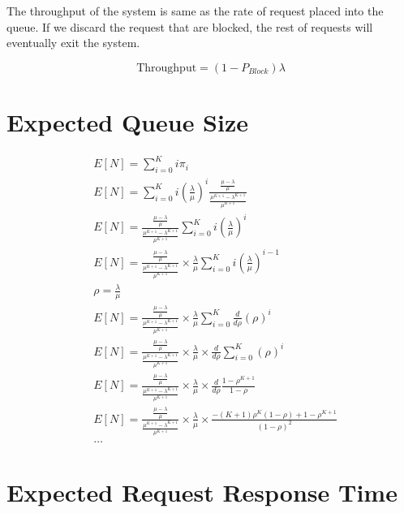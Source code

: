 \documentclass{article}
\begin{document}
The throughput of the system is same as the rate of request placed into the
queue. If we discard the request that are blocked, the rest of requests will
eventually exit the system.

\begin{equation}
	\text{Throughput} = (1 - P_{Block}) \lambda
\end{equation}


\section{Expected Queue Size}

\begin{align*}
	&E[N] = \sum_{i = 0}^{K}{i \pi_{i}} \\
	&E[N] = \sum_{i = 0}^{K}{i {(\frac{\lambda}{\mu})}^{i} \frac{\frac{\mu - \lambda}{\mu}}{\frac{\mu^{K+1} - \lambda^{K+1}}{{\mu^{K+1}}}}} \\
	&E[N] = \frac{\frac{\mu - \lambda}{\mu}}{\frac{\mu^{K+1} - \lambda^{K+1}}{{\mu^{K+1}}}} \sum_{i = 0}^{K}{i {(\frac{\lambda}{\mu})}^{i}} \\
	&E[N] = \frac{\frac{\mu - \lambda}{\mu}}{\frac{\mu^{K+1} - \lambda^{K+1}}{{\mu^{K+1}}}} \times \frac{\lambda}{\mu} \sum_{i = 0}^{K}{i {(\frac{\lambda}{\mu})}^{i - 1}} \\
	& \rho = \frac{\lambda}{\mu} \\
	&E[N] = \frac{\frac{\mu - \lambda}{\mu}}{\frac{\mu^{K+1} - \lambda^{K+1}}{{\mu^{K+1}}}} \times \frac{\lambda}{\mu} \sum_{i = 0}^{K}{\frac{d}{d \rho} {(\rho)}^{i}} \\
	&E[N] = \frac{\frac{\mu - \lambda}{\mu}}{\frac{\mu^{K+1} - \lambda^{K+1}}{{\mu^{K+1}}}} \times \frac{\lambda}{\mu} \times \frac{d}{d \rho} \sum_{i = 0}^{K}{{(\rho)}^{i}} \\
	&E[N] = \frac{\frac{\mu - \lambda}{\mu}}{\frac{\mu^{K+1} - \lambda^{K+1}}{{\mu^{K+1}}}} \times \frac{\lambda}{\mu} \times \frac{d}{d \rho} \frac{1 - \rho^{K+1}}{1 - \rho} \\
	&E[N] = \frac{\frac{\mu - \lambda}{\mu}}{\frac{\mu^{K+1} - \lambda^{K+1}}{{\mu^{K+1}}}} \times \frac{\lambda}{\mu} \times \frac{-(K+1) \rho^{K} (1 - \rho) + 1 - \rho^{K+1}}{{(1 - \rho)}^2} \\
	& \dots
\end{align*}


\section{Expected Request Response Time}
\end{document}
